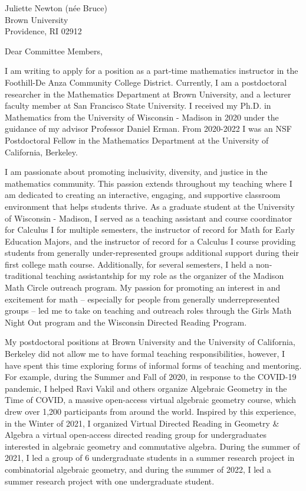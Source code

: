 \documentclass[11pt]{brownletter}
\date{October 14, 2023} %
\begin{document}
\begin{letter}{Juliette Newton (n\'{e}e Bruce)\\ 
               Brown University\\ 
               Providence, RI 02912}

\opening{Dear Committee Members,}

I am writing to apply for a position as a part-time mathematics instructor in the Foothill-De Anza Community College District. Currently, I am a postdoctoral researcher in the Mathematics Department at Brown University, and a lecturer faculty member at San Francisco State University. I received my Ph.D. in Mathematics from the University of Wisconsin - Madison in 2020 under the guidance of my advisor Professor Daniel Erman. From 2020-2022 I was an NSF Postdoctoral Fellow in the Mathematics Department at the University of California, Berkeley.

I am passionate about promoting inclusivity, diversity, and justice in the mathematics community. This passion extends throughout my teaching where I am dedicated to creating an interactive, engaging, and supportive classroom environment that helps students thrive. As a graduate student at the University of Wisconsin - Madison, I served as a teaching assistant and course coordinator for Calculus I for multiple semesters, the instructor of record for Math for Early Education Majors, and the instructor of record for a Calculus I course providing students from generally under-represented groups additional support during their first college math course. Additionally, for several semesters, I held a non-traditional teaching assistantship for my role as the organizer of the Madison Math Circle outreach program. My passion for promoting an interest in and excitement for math – especially for people from generally underrepresented groups – led me to take on teaching and outreach roles through the Girls Math Night Out program and the Wisconsin Directed Reading Program.

My postdoctoral positions at Brown University and the University of California, Berkeley did not allow me to have formal teaching responsibilities, however, I have spent this time exploring forms of informal forms of teaching and mentoring. For example, during the Summer and Fall of 2020, in response to the COVID-19 pandemic, I helped Ravi Vakil and others organize Algebraic Geometry in the Time of COVID, a massive open-access virtual algebraic geometry course, which drew over 1,200 participants from around the world. Inspired by this experience, in the Winter of 2021, I organized Virtual Directed Reading in Geometry \& Algebra a virtual open-access directed reading group for undergraduates interested in algebraic geometry and commutative algebra. During the summer of 2021, I led a group of 6 undergraduate students in a summer research project in combinatorial algebraic geometry, and during the summer of 2022, I led a summer research project with one undergraduate student.


\end{letter}
\end{document}

